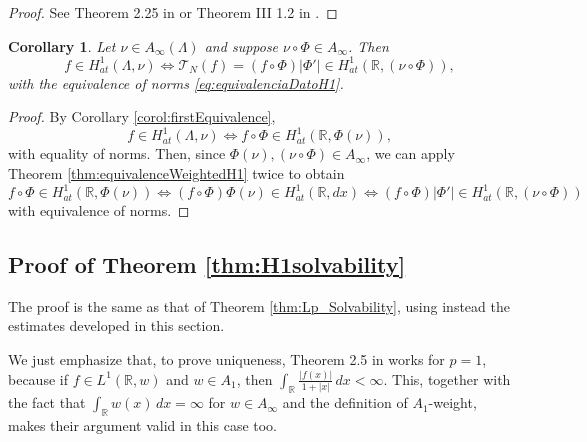 \documentclass[12pt]{amsart}
\newcommand{\R}{\mathbb{R}}
\theoremstyle{plain}
\newtheorem{corollary}[theorem]{Corollary}
\theoremstyle{definition}
\numberwithin{equation}{section}
\begin{document}
\begin{proof}
    See Theorem 2.25 in \cite{coifmanWeiss} or Theorem III 1.2 in \cite{GarciaCuerva}.
\end{proof}



\begin{corollary}\label{corol:equivalenciaNormaH1DatoNeumann}
    Let $\nu\in A_{\infty}(\Lambda)$ and suppose $\nu\circ\Phi\in A_{\infty}$. Then
    \[
    f\in H_{at}^1(\Lambda,\nu)
    \iff 
    \mathcal{T}_N(f)=(f\circ\Phi)|\Phi'|
    \in
    H_{at}^1(\R,(\nu\circ\Phi)),
    \]
    with the equivalence of norms \eqref{eq:equivalenciaDatoH1}.
\end{corollary}

\begin{proof}
By Corollary \ref{corol:firstEquivalence},
\[
f\in H_{at}^1(\Lambda,\nu)
\iff
f\circ\Phi\in H_{at}^1(\R,\Phi(\nu)),
\]
with equality of norms. Then, since $\Phi(\nu), (\nu\circ\Phi)\in A_{\infty}$, we can apply Theorem \ref{thm:equivalenceWeightedH1} twice to obtain
\[
f\circ \Phi\in H^1_{at}(\R,\Phi(\nu))
\iff
(f\circ \Phi)\Phi(\nu)\in H_{at}^1(\R,dx)\iff (f\circ\Phi)|\Phi'|
\in
H_{at}^1(\R,(\nu\circ\Phi))
\]
with equivalence of norms. \qedhere
\end{proof}













\subsection{Proof of Theorem \ref{thm:H1solvability}}

The proof is the same as that of Theorem \ref{thm:Lp_Solvability}, using instead the estimates developed in this section.

We just emphasize that, to prove uniqueness, Theorem 2.5 in \cite{transmissionCarro} works for $p=1$, because if $f\in L^1(\R,w)$ and $w\in A_1$, then $\int_{\R}\frac{|f(x)|}{1+|x|}\, dx<\infty$. This, together with the fact that $\int_{\R}w(x)\, dx=\infty$ for $w\in A_{\infty}$ and the definition of $A_1$-weight, makes their argument valid in this case too.
\end{document}
